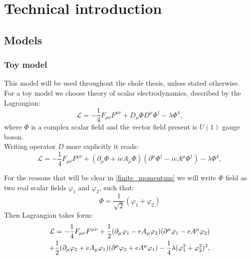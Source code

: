 \chapter{Technical introduction}
\section{Models}
\subsection{Toy model}
This model will be used throughout the ehole thesis, unless stated otherwise. \\
For a toy model we choose theory of scalar electrodynamics, described by the Lagrangian:
\begin{equation}
\mathcal{L} = -\frac{1}{4}F_{\mu\nu}F^{\mu\nu}+D_\mu\Phi D^\mu\Phi^\dag-\lambda\Phi^4,
\end{equation}
where $\Phi$ is a complex scalar field and the vector field present is $U(1)$ gauge boson. \\


Writing operator $D$ more explicitly it reads:
\begin{equation}
\mathcal{L} = -\frac{1}{4}F_{\mu\nu}F^{\mu\nu}+(\partial_\mu\Phi + ieA_\mu\Phi) 
(\partial^\mu\Phi^\dag-ieA^\mu\Phi^\dag)-\lambda\Phi^4,
\end{equation}

For the reasons that will be clear in \ref{finite_momentum} we will write $\Phi$ field as two real scalar fields 
$\varphi_1$ and $\varphi_2$, such that:
\begin{equation}
\Phi = \frac{1}{\sqrt{2}}(\varphi_1+\varphi_2)
\end{equation}
Then Lagrangian takes form:
\begin{align}
\mathcal{L} = -\frac{1}{4}F_{\mu\nu}F^{\mu\nu}+ \frac{1}{2}(\partial_\mu\varphi_1 - eA_\mu\varphi_2)
(\partial^\mu\varphi_1 - eA^\mu\varphi_2)  \\
+\frac{1}{2}(\partial_\mu\varphi_2+eA_\mu\varphi_1)(\partial^\mu\varphi_2+eA^\mu\varphi_1) 
-\frac{1}{4}\lambda(\varphi_1^2+\varphi_2^2)^2,\notag
\end{align}

